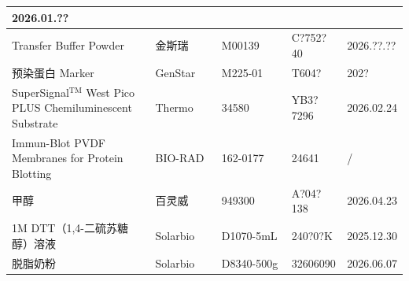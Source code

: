 \documentclass[UTF8,10pt,a4paper,fontset=fandol]{ctexart}
\newcommand{\fieldvalue}[1]{#1}
\newcommand{\handwritten}[1]{#1}
\begin{document}
\begin{center}
\begin{tabular}{|p{0.37\linewidth}|p{0.17\linewidth}|p{0.18\linewidth}|p{0.14\linewidth}|p{0.14\linewidth}|}
\fieldvalue{\handwritten{2026.01.??}} \\
\hline
Transfer Buffer Powder & 金斯瑞 & M00139 &
\fieldvalue{\handwritten{C?752?40}} &
\fieldvalue{\handwritten{2026.??.??}} \\
\hline
预染蛋白 Marker & GenStar & M225-01 &
\fieldvalue{\handwritten{T604?}} &
\fieldvalue{\handwritten{202?}} \\
\hline
SuperSignal$^{\mathrm{TM}}$ West Pico PLUS
Chemiluminescent Substrate
& Thermo & 34580 &
\fieldvalue{\handwritten{YB3?7296}} &
\fieldvalue{\handwritten{2026.02.24}} \\
\hline
Immun-Blot PVDF Membranes for Protein Blotting
& BIO-RAD &
\fieldvalue{\handwritten{162-0177}} &
\fieldvalue{\handwritten{24641}} &
\fieldvalue{\handwritten{/}} \\
\hline
甲醇 & 百灵威 & 949300 &
\fieldvalue{\handwritten{A?04?138}} &
\fieldvalue{\handwritten{2026.04.23}} \\
\hline
1M DTT（1,4-二硫苏糖醇）溶液 & Solarbio & D1070-5mL &
\fieldvalue{\handwritten{240?0?K}} &
\fieldvalue{\handwritten{2025.12.30}} \\
\hline
脱脂奶粉 & Solarbio & D8340-500g &
\fieldvalue{\handwritten{32606090}} &
\fieldvalue{\handwritten{2026.06.07}} \\
\hline
\end{tabular}
\end{center}
\end{document}
